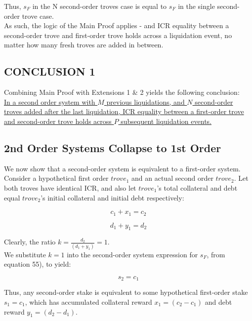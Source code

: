 \documentclass[reqno]{article}
\begin{document}
Thus, $s_F$ in the N second-order troves case is equal to $s_F$ in the single second-order trove case.\\

As such, the logic of the Main Proof applies - and ICR equality between a second-order trove and first-order trove holds across a liquidation event, no matter how many fresh troves are added in between.

\subsection{CONCLUSION 1}

\bigskip
Combining Main Proof with Extensions 1 \& 2 yields the following conclusion:\\

\uline{In a second order system with $M$ previous liquidations, and $N$ second-order troves added after the last liquidation, ICR equality between a first-order trove and second-order trove holds across $P$ subsequent liquidation events.}\\

\subsection{2nd Order Systems Collapse to 1st Order}
We now show that a second-order system is equivalent to a first-order system.\\

Consider a hypothetical first order $trove_1$ and an actual second order $trove_2$. Let both troves have identical ICR, and also let $trove_1$’s total collateral and debt equal $trove_2$’s initial collateral and initial debt respectively:

\begin{equation} 
    c_1+x_1=c_2
\end{equation}

\begin{equation} 
    d_1+y_1=d_2
\end{equation}

\bigskip
Clearly, the ratio  $k = \frac{d_2}{(d_1+y_1)} = 1$.\\

We substitute $k=1$ into the second-order system expression for $s_F$, from equation 55), to yield:

\begin{equation} 
    s_2=c_1
\end{equation}

\bigskip
Thus, any second-order stake is equivalent to some hypothetical first-order stake $s_1=c_1$, which has accumulated collateral reward $x_1=(c_2-c_1)$ and debt reward $y_1=(d_2-d_1)$.\\
\end{document}
